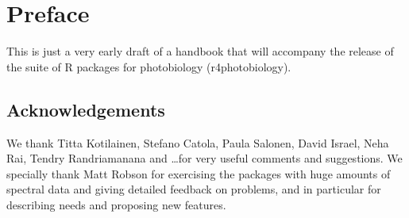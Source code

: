 \chapter{Preface}

This is just a very early draft of a handbook that will accompany the release of the suite of R packages for photobiology (\textsf{r4photobiology}).

\section{Acknowledgements}

We thank Titta Kotilainen, Stefano Catola, Paula Salonen, David Israel, Neha Rai, Tendry Randriamanana and \ldots for very useful comments and suggestions. We specially thank Matt Robson for exercising the packages with huge amounts of spectral data and giving detailed feedback on problems, and in particular for describing needs and proposing new features.
